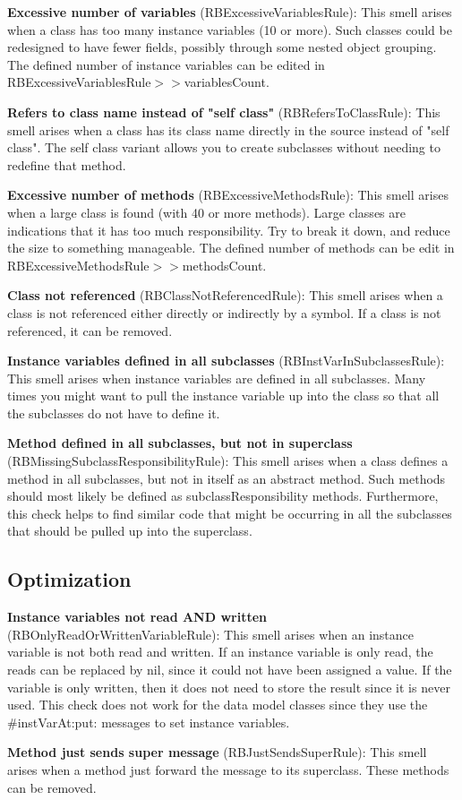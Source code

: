 \textbf{Excessive number of variables} (RBExcessiveVariablesRule): This smell arises when a class has too many instance variables (10 or more). Such classes could be redesigned to have fewer fields, possibly through some nested object grouping. The defined number of instance variables can be edited in RBExcessiveVariablesRule$>>$variablesCount.

\textbf{Refers to class name instead of "self class"} (RBRefersToClassRule): This smell arises when a class has its class name directly in the source instead of "self class". The self class variant allows you to create subclasses without needing to redefine that method.

\textbf{Excessive number of methods} (RBExcessiveMethodsRule): This smell arises when a large class is found (with 40 or more methods). Large classes are indications that it has too much responsibility. Try to break it down, and reduce the size to something manageable. The defined number of methods can be edit in RBExcessiveMethodsRule$>>$methodsCount.

\textbf{Class not referenced} (RBClassNotReferencedRule): This smell arises when a class is not referenced either directly or indirectly by a symbol. If a class is not referenced, it can be removed.

\textbf{Instance variables defined in all subclasses} (RBInstVarInSubclassesRule): This smell arises when instance variables are defined in all subclasses. Many times you might want to pull the instance variable up into the class so that all the subclasses do not have to define it.

\textbf{Method defined in all subclasses, but not in superclass} (RBMissingSubclassResponsibilityRule): This smell arises when a class defines a method in all subclasses, but not in itself as an abstract method. Such methods should most likely be defined as subclassResponsibility methods. Furthermore, this check helps to find similar code that might be occurring in all the subclasses that should be pulled up into the superclass.

\subsection{Optimization}
\textbf{Instance variables not read AND written} (RBOnlyReadOrWrittenVariableRule): This smell arises when an instance variable is not both read and written. If an instance variable is only read, the reads can be replaced by nil, since it could not have been assigned a value. If the variable is only written, then it does not need to store the result since it is never used. This check does not work for the data model classes since they use the \#instVarAt:put: messages to set instance variables.

\textbf{Method just sends super message} (RBJustSendsSuperRule): This smell arises when a method just forward the message to its superclass. These methods can be removed.

